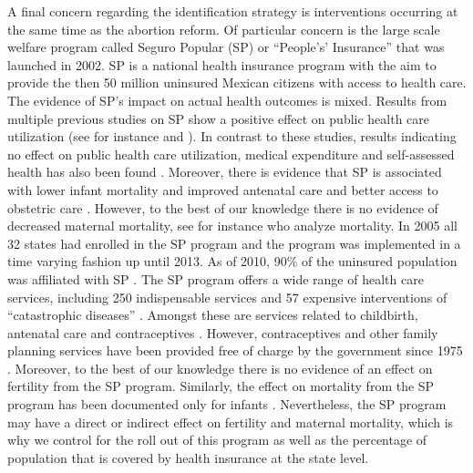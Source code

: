 \documentclass[a4paper, 11pt]{article}
\begin{document}
\begin{spacing}{1.4}
A final concern regarding the identification strategy is interventions occurring at the
same time as the abortion reform. Of particular concern is the large scale welfare
program called Seguro Popular (SP) or ``People's' Insurance'' that was launched in 2002.
SP is a national health insurance program with the aim to provide the then 50 million
uninsured Mexican citizens with access to health care.  The evidence of SP's impact on
actual health outcomes is mixed. Results from multiple previous studies on SP show a
positive effect on public health care utilization (see for instance
\citet{knox_health_2008} and \cite{barros2008wealthier}). In contrast to these studies,
results indicating no effect on public health care utilization, medical expenditure and
self-assessed health has also been found \cite{king2009public}. Moreover, there is
evidence that SP is associated with lower infant mortality and improved antenatal care
\citep{conti2014evaluating} and better access to obstetric care
\citep{sosa2009heterogeneous}. However, to the best of our knowledge there is no
evidence of decreased maternal mortality, see for instance \citep{conti2014evaluating}
who analyze mortality. In 2005 all 32 states had enrolled in the SP program
\citep{Knauletal2007} and the program was implemented in a time varying fashion up until
2013.  As of 2010, 90\% of the uninsured population was affiliated with SP
\citep{bosch2012taking}. The SP program offers a wide range of health care services,
including 250 indispensable services and 57 expensive interventions of ``catastrophic
diseases'' \citep{Darney2015}. Amongst these are services related to childbirth,
antenatal care \citep{knox_health_2008} and contraceptives \citep{Darney2015}. However,
contraceptives and other family planning services have been provided free of charge by
the government since 1975 \citep{GIRE2009}. Moreover, to the best of our knowledge there
is no evidence of an effect on fertility from the SP program. Similarly, the effect on
mortality from the SP program has been documented only for infants \citep{conti2014evaluating}.
Nevertheless, the SP program may have a direct or indirect effect on fertility and
maternal mortality, which is why we control for the roll out of this program as well
as the percentage of population that is covered by health insurance at the state level.
 

\end{spacing}
\end{document}
